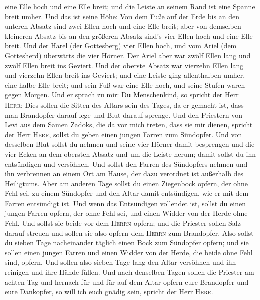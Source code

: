 eine Elle hoch und eine Elle breit; und die Leiste an seinem Rand ist
eine Spanne breit umher.  Und das ist seine Höhe: Von dem
Fuße auf der Erde bis an den unteren Absatz sind zwei Ellen hoch und
eine Elle breit; aber von demselben kleineren Absatz bis an den größeren
Absatz sind's vier Ellen hoch und eine Elle breit.  Und
der Harel (der Gottesberg) vier Ellen hoch, und vom Ariel (dem
Gottesherd) überwärts die vier Hörner.  Der Ariel aber
war zwölf Ellen lang und zwölf Ellen breit ins Geviert. 
Und der oberste Absatz war vierzehn Ellen lang und vierzehn Ellen breit
ins Geviert; und eine Leiste ging allenthalben umher, eine halbe Elle
breit; und sein Fuß war eine Elle hoch, und seine Stufen waren gegen
Morgen.  Und er sprach zu mir: Du Menschenkind, so
spricht der Herr \textsc{Herr}: Dies sollen die Sitten des Altars sein
des Tages, da er gemacht ist, dass man Brandopfer darauf lege und Blut
darauf sprenge.  Und den Priestern von Levi aus dem Samen
Zadoks, die da vor mich treten, dass sie mir dienen, spricht der Herr
\textsc{Herr}, sollst du geben einen jungen Farren zum Sündopfer.
 Und von desselben Blut sollst du nehmen und seine vier
Hörner damit besprengen und die vier Ecken an dem obersten Absatz und um
die Leiste herum; damit sollst du ihn entsündigen und versöhnen.
 Und sollst den Farren des Sündopfers nehmen und ihn
verbrennen an einem Ort am Hause, der dazu verordnet ist außerhalb des
Heiligtums.  Aber am anderen Tage sollst du einen
Ziegenbock opfern, der ohne Fehl sei, zu einem Sündopfer und den Altar
damit entsündigen, wie er mit dem Farren entsündigt ist. 
Und wenn das Entsündigen vollendet ist, sollst du einen jungen Farren
opfern, der ohne Fehl sei, und einen Widder von der Herde ohne Fehl.
 Und sollst sie beide vor dem \textsc{Herrn} opfern; und
die Priester sollen Salz darauf streuen und sollen sie also opfern dem
\textsc{Herrn} zum Brandopfer.  Also sollst du sieben
Tage nacheinander täglich einen Bock zum Sündopfer opfern; und sie
sollen einen jungen Farren und einen Widder von der Herde, die beide
ohne Fehl sind, opfern.  Und sollen also sieben Tage lang
den Altar versöhnen und ihn reinigen und ihre Hände füllen.
 Und nach denselben Tagen sollen die Priester am achten
Tag und hernach für und für auf dem Altar opfern eure Brandopfer und
eure Dankopfer, so will ich euch gnädig sein, spricht der Herr
\textsc{Herr}.


